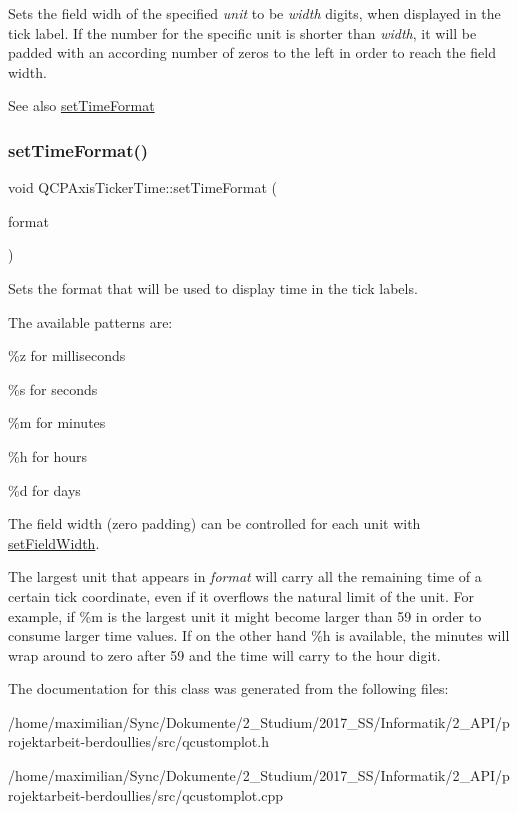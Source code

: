 Sets the field widh of the specified {\itshape unit} to be {\itshape width} digits, when displayed in the tick label. If the number for the specific unit is shorter than {\itshape width}, it will be padded with an according number of zeros to the left in order to reach the field width.

\begin{DoxySeeAlso}{See also}
\hyperlink{class_q_c_p_axis_ticker_time_a2f30b6e5125bce4256be9ce3177088ea}{set\+Time\+Format} 
\end{DoxySeeAlso}
\mbox{\label{class_q_c_p_axis_ticker_time_a2f30b6e5125bce4256be9ce3177088ea}} 
\subsubsection{\texorpdfstring{set\+Time\+Format()}{setTimeFormat()}}
{\footnotesize\ttfamily void Q\+C\+P\+Axis\+Ticker\+Time\+::set\+Time\+Format (\begin{DoxyParamCaption}\item[{const Q\+String \&}]{format }\end{DoxyParamCaption})}

Sets the format that will be used to display time in the tick labels.

The available patterns are\+:
\begin{DoxyItemize}
\item \%z for milliseconds
\item \%s for seconds
\item \%m for minutes
\item \%h for hours
\item \%d for days
\end{DoxyItemize}

The field width (zero padding) can be controlled for each unit with \hyperlink{class_q_c_p_axis_ticker_time_adc13e54fc969be98a5c0e3fa0dbaa293}{set\+Field\+Width}.

The largest unit that appears in {\itshape format} will carry all the remaining time of a certain tick coordinate, even if it overflows the natural limit of the unit. For example, if \%m is the largest unit it might become larger than 59 in order to consume larger time values. If on the other hand \%h is available, the minutes will wrap around to zero after 59 and the time will carry to the hour digit. 

The documentation for this class was generated from the following files\+:\begin{DoxyCompactItemize}
\item 
/home/maximilian/\+Sync/\+Dokumente/2\+\_\+\+Studium/2017\+\_\+\+S\+S/\+Informatik/2\+\_\+\+A\+P\+I/projektarbeit-\/berdoullies/src/qcustomplot.\+h\item 
/home/maximilian/\+Sync/\+Dokumente/2\+\_\+\+Studium/2017\+\_\+\+S\+S/\+Informatik/2\+\_\+\+A\+P\+I/projektarbeit-\/berdoullies/src/qcustomplot.\+cpp\end{DoxyCompactItemize}
